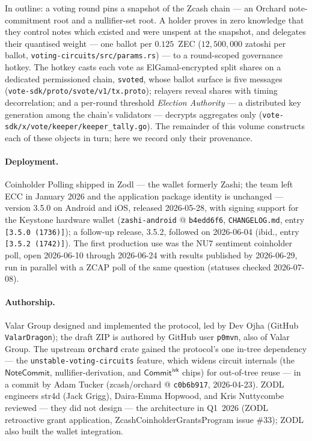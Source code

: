 \documentclass[11pt,a4paper]{article}
\theoremstyle{definition}
\newcommand{\NoteCommit}{\ensuremath{\mathsf{NoteCommit}}}
\newcommand{\CommitIvk}{\ensuremath{\mathsf{Commit}^{\mathsf{ivk}}}}
\begin{document}
In outline: a voting round pins a snapshot of the Zcash chain --- an Orchard
note-commitment root and a nullifier-set root. A holder proves in zero
knowledge that they control notes which existed and were unspent at the
snapshot, and delegates their quantised weight --- one ballot per $0.125$~ZEC
($12{,}500{,}000$ zatoshi per ballot,
\texttt{voting-circuits/src/params.rs}) --- to a round-scoped governance
hotkey. The hotkey casts each vote as ElGamal-encrypted split shares on a
dedicated permissioned chain, \texttt{svoted}, whose ballot surface is five
messages (\texttt{vote-sdk/proto/svote/v1/tx.proto}); relayers reveal shares
with timing decorrelation; and a per-round threshold \emph{Election
Authority} --- a distributed key generation among the chain's validators ---
decrypts aggregates only (\texttt{vote-sdk/x/vote/keeper/keeper\_tally.go}).
The remainder of this volume constructs each of these objects in turn; here
we record only their provenance.

\paragraph{Deployment.} Coinholder Polling shipped in Zodl --- the wallet
formerly Zashi; the team left ECC in January 2026 and the application package
identity is unchanged --- version 3.5.0 on Android and iOS, released
2026-05-28, with signing support for the Keystone hardware wallet
(\texttt{zashi-android} @ \texttt{b4edd6f6}, \texttt{CHANGELOG.md}, entry
\texttt{[3.5.0 (1736)]}); a follow-up release, 3.5.2, followed on 2026-06-04
(ibid., entry \texttt{[3.5.2 (1742)]}). The first production use was the NU7
sentiment coinholder poll, open 2026-06-10 through 2026-06-24 with results
published by 2026-06-29, run in parallel with a ZCAP poll of the same
question (statuses checked 2026-07-08).

\paragraph{Authorship.} Valar Group designed and implemented the protocol,
led by Dev Ojha (GitHub \texttt{ValarDragon}); the draft ZIP is authored by
GitHub user \texttt{p0mvn}, also of Valar Group. The upstream
\texttt{orchard} crate gained the protocol's one in-tree dependency --- the
\texttt{unstable-voting-circuits} feature, which widens circuit internals
(the \NoteCommit{}, nullifier-derivation, and \CommitIvk{} chips) for
out-of-tree reuse --- in a commit by Adam Tucker (zcash/orchard @
\texttt{c0b6b917}, 2026-04-23). ZODL engineers str4d (Jack Grigg),
Daira-Emma Hopwood, and Kris Nuttycombe reviewed --- they did not design ---
the architecture in Q1~2026 (ZODL retroactive grant application,
ZcashCoinholderGrantsProgram issue \#33); ZODL also built the wallet
integration.
\end{document}
